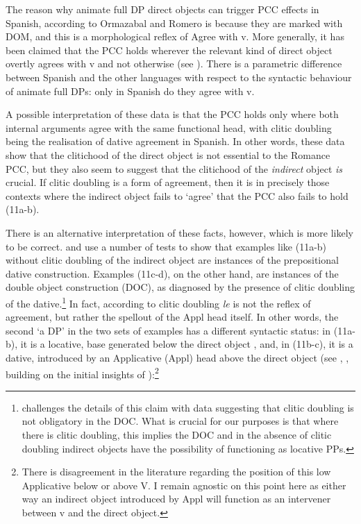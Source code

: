 \documentclass[output=paper,modfonts,nonflat]{langsci/langscibook}
\begin{document}
The reason why animate full DP direct objects can trigger PCC effects in Spanish, according to Ormazabal and Romero is because they are marked with DOM, and this is a morphological reflex of Agree with v. More generally, it has been claimed that the PCC holds wherever the relevant kind of direct object overtly agrees with v and not otherwise (see \citealt{Preminger2019}). There is a parametric difference between Spanish and the other languages with respect to the syntactic behaviour of animate full DPs: only in Spanish do they agree with v. 

A possible interpretation of these data is that the PCC holds only where both internal arguments agree with the same functional head, with clitic doubling being the realisation of dative agreement in Spanish. In other words, these data show that the clitichood of the direct object is not essential to the Romance PCC, but they also seem to suggest that the clitichood of the \textit{indirect} object \textit{is} crucial. If clitic doubling is a form of agreement, then it is in precisely those contexts where the indirect object fails to ‘agree’ that the PCC also fails to hold (11a-b). 

There is an alternative interpretation of these facts, however, which is more likely to be correct. \citet{Demonte1995} and \citet{Cuervo2003} use a number of tests to show that examples like (11a-b) without clitic doubling of the indirect object are instances of the prepositional dative construction. Examples (11c-d), on the other hand, are instances of the double object construction (DOC), as diagnosed by the presence of clitic doubling of the dative.\footnote{\citet{Pineda2013} challenges the details of this claim with data suggesting that clitic doubling is not obligatory in the DOC. What is crucial for our purposes is that where there is clitic doubling, this implies the DOC and in the absence of clitic doubling indirect objects have the possibility of functioning as locative PPs.}  In fact, according to \citet{Cuervo2003} clitic doubling \textit{le} is not the reflex of agreement, but rather the spellout of the Appl head itself.  In other words, the second ‘a DP’ in the two sets of examples has a different syntactic status: in (11a-b), it is a locative, base generated below the direct object , and, in (11b-c), it is a dative, introduced by an Applicative (Appl) head above the direct object  (see \citealt{Harley2002}, \citealt{HarleyMiyagawa2017}, building on the initial insights of \citealt{Oehrle1976}):\footnote{There is disagreement in the literature regarding the position of this low Applicative below or above V. I remain agnostic on this point here as either way an indirect object introduced by Appl will function as an intervener between v and the direct object.} 
\end{document}
